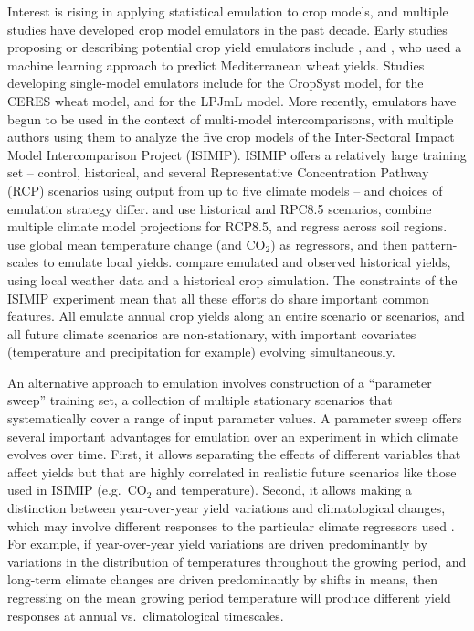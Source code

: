 \documentclass[gmd, manuscript]{copernicus} %
\begin{document}
Interest is rising in applying statistical emulation to crop models, and multiple studies have developed crop model emulators in the past decade.
Early studies proposing or describing potential crop yield emulators include \citet{Howden2005, raisen2006, Lobell2010}, and \citet{Ferrise2011}, who used a machine learning approach to predict Mediterranean wheat yields. 
Studies developing single-model emulators include  \citet{Holzkamper2012} for the CropSyst model, \citet{RUANE2013a} for the CERES wheat model, and \citet{Oyebamiji15} for the LPJmL model. 
More recently, emulators have begun to be used in the context of multi-model intercomparisons, with multiple authors \citep{BLANC2015, BLANC2017, Ostberg2018, Mistry2017}  using them to analyze the five crop models  of the Inter-Sectoral Impact Model Intercomparison Project (ISIMIP). ISIMIP offers a relatively large training set --  control, historical, and several Representative Concentration Pathway (RCP) scenarios using output from up to five climate models \citep{Warszawski3228, Frieler2017} -- and choices of emulation strategy differ.
\citet{BLANC2015} and \citet{BLANC2017} use historical and RPC8.5 scenarios, combine multiple climate model projections for RCP8.5, and regress across soil regions. 
\citet{Ostberg2018} use global mean temperature change (and CO$_2$) as regressors, and then pattern-scales to emulate local yields. 
\citet{Mistry2017} compare emulated and observed historical yields, using local weather data and a historical crop simulation. 
The constraints of the ISIMIP experiment mean that all these efforts do share important common features. 
All emulate annual crop yields along an entire scenario or scenarios, and all future climate scenarios are non-stationary, with important covariates (temperature and precipitation for example) evolving simultaneously. 

An alternative approach to emulation involves construction of a ``parameter sweep'' training set, a collection of multiple stationary scenarios that systematically cover a range of input parameter values.
A parameter sweep offers several important advantages for emulation over an experiment in which climate evolves over time. 
First, it allows separating the effects of different variables that affect yields but that are highly correlated in realistic future scenarios 
like those used in ISIMIP 
(e.g.\ CO$_2$ and temperature). 
Second, it allows making a distinction between year-over-year yield variations and climatological changes, which may involve different responses to the particular climate regressors used \citep[e.g.][]{Ruane2016}. 
For example, if year-over-year yield variations are driven predominantly by variations in the distribution of temperatures throughout the growing period, and long-term climate changes are driven predominantly by shifts in means, then regressing on the mean growing period temperature will produce different yield responses at annual vs.\ climatological timescales.  
\end{document}
